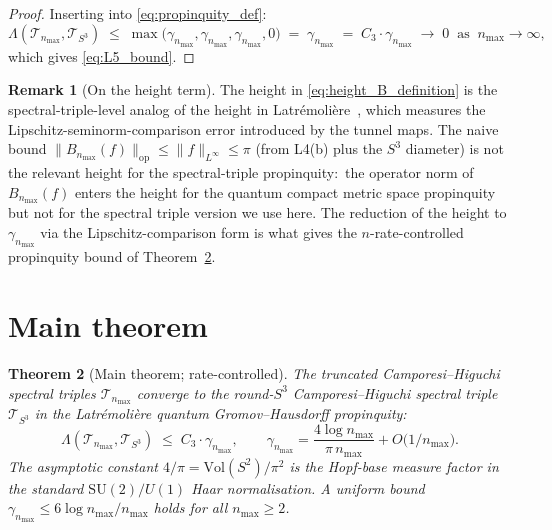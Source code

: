 \documentclass[11pt,a4paper]{article}
\theoremstyle{plain}
\newtheorem{theorem}{Theorem}[section]
\theoremstyle{definition}
\newtheorem{remark}[theorem]{Remark}
\newcommand{\nmax}{n_{\max}}
\newcommand{\sthree}{S^{3}}
\newcommand{\Tcal}{\mathcal{T}}
\newcommand{\opnorm}[1]{\lVert #1 \rVert_{\mathrm{op}}}
\newcommand{\norm}[1]{\lVert #1 \rVert}
\newcommand{\SU}{\mathrm{SU}}
\newcommand{\Vol}{\mathrm{Vol}}
\begin{document}
\begin{proof}
Inserting into \eqref{eq:propinquity_def}:
\begin{equation*}
   \Lambda(\Tcal_{\nmax}, \Tcal_{\sthree})
   \;\le\; \max\bigl(\gamma_{\nmax}, \gamma_{\nmax},
   \gamma_{\nmax}, 0\bigr)
   \;=\; \gamma_{\nmax}
   \;=\; C_3 \cdot \gamma_{\nmax}
   \;\to\; 0 \;\;\text{as}\;\; \nmax \to \infty,
\end{equation*}
which gives \eqref{eq:L5_bound}.
\end{proof}

\begin{remark}[On the height term]\label{rem:height_definition}
The height in \eqref{eq:height_B_definition} is the
spectral-triple-level analog of the height in
Latr\'emoli\`ere~\cite[\S 4]{latremoliere_metric_st_2017}, which
measures the Lipschitz-seminorm-comparison error introduced by the
tunnel maps. The naive bound $\opnorm{B_{\nmax}(f)} \le \norm{f}_{L^\infty}
\le \pi$ (from L4(b) plus the $\sthree$ diameter) is not the relevant
height for the spectral-triple propinquity:\ the operator norm of
$B_{\nmax}(f)$ enters the height for the quantum compact metric
space propinquity \cite{latremoliere2018} but not for the spectral
triple version we use here. The reduction of the height to
$\gamma_{\nmax}$ via the Lipschitz-comparison form is what gives the
$n$-rate-controlled propinquity bound of Theorem~\ref{thm:main}.
\end{remark}

\section{Main theorem}\label{sec:main_theorem}

\begin{theorem}[Main theorem; rate-controlled]\label{thm:main}
The truncated Camporesi--Higuchi spectral triples $\Tcal_{\nmax}$
converge to the round-$\sthree$ Camporesi--Higuchi spectral triple
$\Tcal_{\sthree}$ in the Latr\'emoli\`ere quantum Gromov--Hausdorff
propinquity:
\begin{equation}\label{eq:main_thm}
   \Lambda(\Tcal_{\nmax}, \Tcal_{\sthree})
   \;\le\; C_3 \cdot \gamma_{\nmax}, \qquad
   \gamma_{\nmax} = \frac{4 \log \nmax}{\pi\,\nmax}
   + O\!\bigl(1/\nmax\bigr).
\end{equation}
The asymptotic constant $4/\pi = \Vol(S^2)/\pi^2$ is the
Hopf-base measure factor in the standard $\SU(2)/U(1)$ Haar
normalisation. A uniform bound $\gamma_{\nmax} \le 6 \log \nmax / \nmax$
holds for all $\nmax \ge 2$.
\end{theorem}
\end{document}
